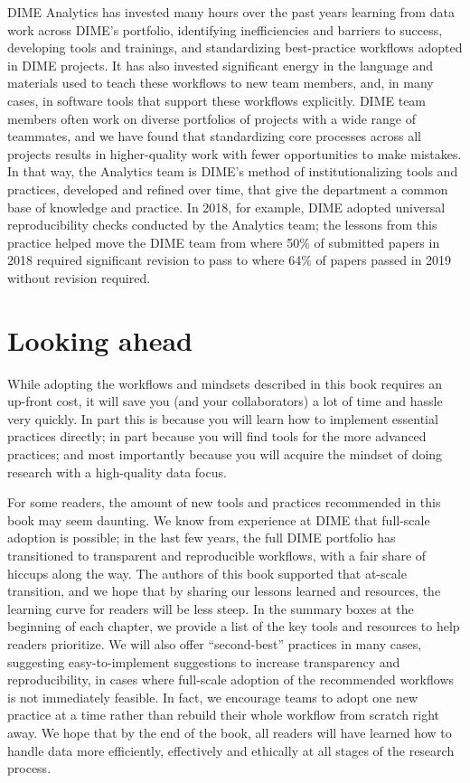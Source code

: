 \documentclass[
]{book}
\begin{document}
DIME Analytics has invested many hours over the past years
learning from data work across DIME's portfolio,
identifying inefficiencies and barriers to success,
developing tools and trainings, and standardizing best-practice workflows adopted in DIME projects.
It has also invested significant energy in the language and materials
used to teach these workflows to new team members,
and, in many cases, in software tools that support these workflows explicitly.
DIME team members often work on diverse portfolios of projects
with a wide range of teammates, and we have found
that standardizing core processes across all projects
results in higher-quality work with fewer opportunities to make mistakes.
In that way, the Analytics team is DIME's method of institutionalizing
tools and practices, developed and refined over time,
that give the department a common base of knowledge and practice.
In 2018, for example, DIME adopted universal reproducibility checks
conducted by the Analytics team;
the lessons from this practice helped move the DIME team
from where 50\% of submitted papers in 2018
required significant revision to pass
to where 64\% of papers passed in 2019 without revision required.

\hypertarget{looking-ahead}{%
\section*{Looking ahead}\label{looking-ahead}}

While adopting the workflows and mindsets described in this book requires an up-front cost,
it will save you (and your collaborators) a lot of time and hassle very quickly.
In part this is because you will learn how to implement essential practices directly;
in part because you will find tools for the more advanced practices;
and most importantly because you will acquire the mindset of doing research with a high-quality data focus.

For some readers, the amount of new tools and practices recommended in this book may seem daunting.
We know from experience at DIME that full-scale adoption is possible;
in the last few years, the full DIME portfolio has transitioned to
transparent and reproducible workflows, with a fair share of hiccups along the way.
The authors of this book supported that at-scale transition,
and we hope that by sharing our lessons learned and resources,
the learning curve for readers will be less steep.
In the summary boxes at the beginning of each chapter,
we provide a list of the key tools and resources to help readers prioritize.
We will also offer ``second-best'' practices in many cases,
suggesting easy-to-implement suggestions to increase transparency and reproducibility,
in cases where full-scale adoption of the recommended workflows is not immediately feasible.
In fact, we encourage teams to adopt one new practice at a time
rather than rebuild their whole workflow from scratch right away.
We hope that by the end of the book,
all readers will have learned how to handle data more efficiently, effectively and ethically
at all stages of the research process.
\end{document}
